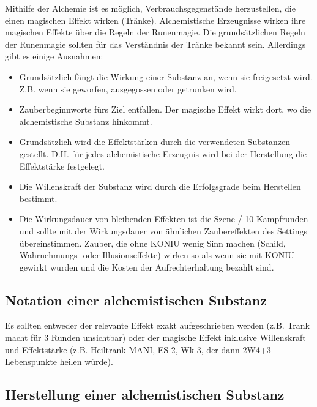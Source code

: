 \documentclass{article}
\begin{document}
Mithilfe der Alchemie ist es möglich, Verbrauchsgegenstände herzustellen, die einen magischen Effekt wirken (Tränke).
Alchemistische Erzeugnisse wirken ihre magischen Effekte über die Regeln der Runenmagie. Die grundsätzlichen Regeln
der Runenmagie sollten für das Verständnis der Tränke bekannt sein. Allerdings gibt es einige Ausnahmen:

\begin{itemize}
\item Grundsätzlich fängt die Wirkung einer Substanz an, wenn sie freigesetzt wird. Z.B. wenn sie geworfen, ausgegossen oder getrunken wird.
\item Zauberbeginnworte fürs Ziel entfallen. Der magische Effekt wirkt dort, wo die alchemistische Substanz hinkommt.
\item Grundsätzlich wird die Effektstärken durch die verwendeten Substanzen gestellt. D.H. für jedes alchemistische Erzeugnis wird bei der Herstellung die Effektstärke festgelegt.
\item Die Willenskraft der Substanz wird durch die Erfolgsgrade beim Herstellen bestimmt.
\item Die Wirkungsdauer von bleibenden Effekten ist die Szene / 10 Kampfrunden und sollte mit der Wirkungsdauer von ähnlichen Zaubereffekten des Settings übereinstimmen. Zauber, die ohne KONIU wenig Sinn machen (Schild, Wahrnehmungs- oder Illusionseffekte) wirken so als wenn sie mit KONIU gewirkt wurden und die Kosten der Aufrechterhaltung bezahlt sind.
\end{itemize}

\begin{center}
\subsection{Notation einer alchemistischen Substanz}
\end{center}

Es sollten entweder der relevante Effekt exakt aufgeschrieben werden (z.B. Trank macht für 3 Runden unsichtbar) oder
der magische Effekt inklusive Willenskraft und Effektstärke (z.B. Heiltrank MANI, ES 2, Wk 3, der dann 2W4+3
Lebenspunkte heilen würde).

\begin{center}
\subsection{Herstellung einer alchemistischen Substanz}
\end{center}
\end{document}
